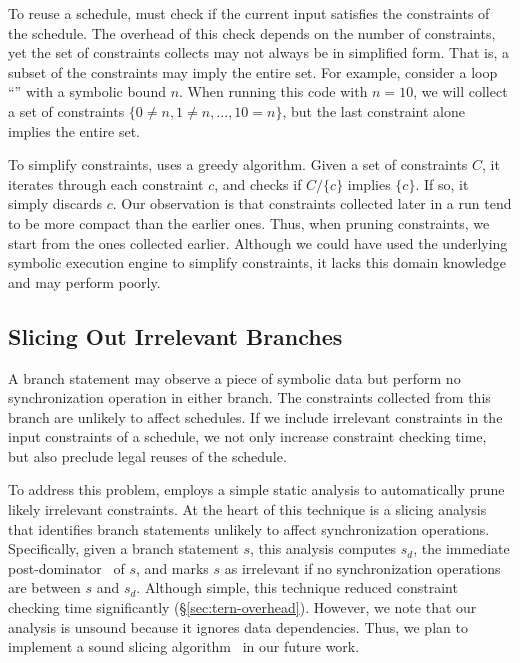 To reuse a schedule, \tern must check if the current input satisfies the
constraints of the schedule.  The overhead of this check depends on the
number of constraints, yet the set of constraints \tern collects may not
always be in simplified form.  That is, a subset of the constraints may
imply the entire set.  For example, consider a loop ``'' with a symbolic bound $n$.  When running this code with
$n=10$, we will collect a set of constraints $\{0 \neq n, 1 \neq n, ...,
10 = n\}$, but the last constraint alone implies the entire set.

To simplify constraints, \tern uses a greedy algorithm.  Given a set of
constraints $C$, it iterates through each constraint $c$, and checks if
$C/\{c\}$ implies $\{c\}$.  If so, it simply discards $c$.  Our
observation is that constraints collected later in a run tend to be more
compact than the earlier ones.  Thus, when pruning constraints, we start
from the ones collected earlier.  Although we could have used the
underlying symbolic execution engine to simplify constraints, it lacks
this domain knowledge and may perform poorly.

\subsection{Slicing Out Irrelevant Branches} \label{sec:tern-slicing}

A branch statement may observe a piece of symbolic data but perform no
synchronization operation in either branch.  The constraints collected
from this branch are unlikely to affect schedules.  If we include
irrelevant constraints in the input constraints of a schedule, we not only
increase constraint checking time, but also preclude legal reuses of the
schedule.

To address this problem, \tern employs a simple static analysis to
automatically prune likely irrelevant constraints.  At the heart of this
technique is a slicing analysis that identifies branch statements unlikely
to affect synchronization operations.  Specifically, given a branch
statement $s$, this analysis computes $s_d$, the immediate
post-dominator~\cite{aho:dragon:06} of $s$, and marks $s$ as irrelevant if
no synchronization operations are between $s$ and $s_d$.  Although simple,
this technique reduced constraint checking time significantly
(\S\ref{sec:tern-overhead}).  However, we note that our analysis is unsound
because it ignores data dependencies.  Thus, we plan to implement a sound
slicing algorithm~\cite{castro:bouncer} in our future work.

